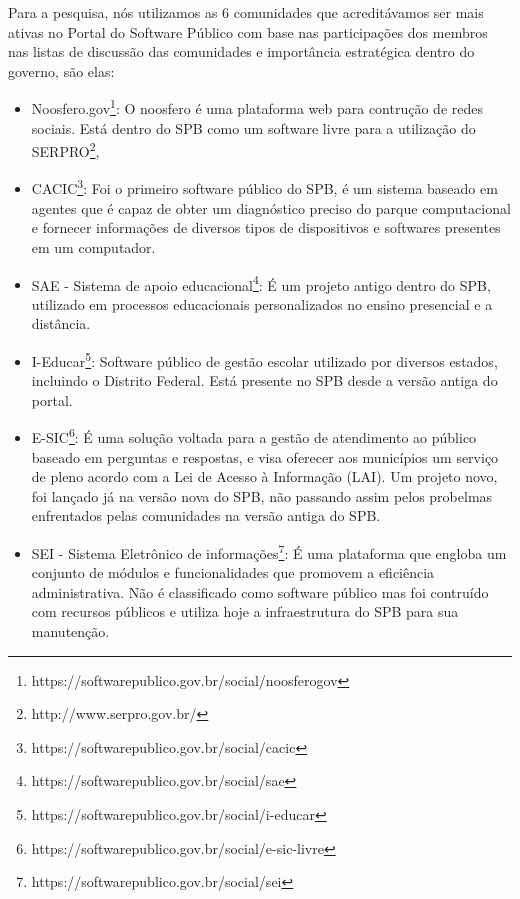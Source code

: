 Para a pesquisa, nós utilizamos as 6 comunidades que acreditávamos ser mais ativas
no Portal do Software Público com base nas participações dos membros nas listas de 
discussão das comunidades e importância estratégica dentro do governo, são elas:

\begin{itemize}

\item Noosfero.gov\footnote{https://softwarepublico.gov.br/social/noosferogov}: 
O noosfero é uma plataforma web para contrução de redes sociais. Está dentro do
SPB como um software livre para a utilização do SERPRO\footnote{http://www.serpro.gov.br/}, 

\item CACIC\footnote{https://softwarepublico.gov.br/social/cacic}: Foi o primeiro 
software público do SPB, é um sistema baseado em agentes que é capaz de obter um 
diagnóstico preciso do parque computacional e fornecer informações de diversos tipos 
de dispositivos e softwares presentes em um computador.

\item SAE - Sistema de apoio educacional\footnote{https://softwarepublico.gov.br/social/sae}:
É um projeto antigo dentro do SPB, utilizado em processos educacionais personalizados no 
ensino presencial e a distância.  

\item I-Educar\footnote{https://softwarepublico.gov.br/social/i-educar}: Software público de 
gestão escolar utilizado por diversos estados, incluindo o Distrito Federal. Está presente
no SPB desde a versão antiga do portal.

\item E-SIC\footnote{https://softwarepublico.gov.br/social/e-sic-livre}: É uma solução voltada 
para a gestão de atendimento ao público baseado em perguntas e respostas, e visa 
oferecer aos municípios um serviço de pleno acordo com a Lei de Acesso à Informação (LAI).
Um projeto novo, foi lançado já na versão nova do SPB, não passando assim pelos 
probelmas enfrentados pelas comunidades na versão antiga do SPB.

\item SEI - Sistema Eletrônico de informações\footnote{https://softwarepublico.gov.br/social/sei}:
É uma plataforma que engloba um conjunto de módulos e funcionalidades que promovem 
a eficiência administrativa. Não é classificado como software público mas foi contruído com
recursos públicos e utiliza hoje a infraestrutura do SPB para sua manutenção.

\end{itemize}

